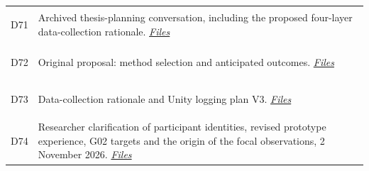 \begin{longtable}{@{}p{14mm}>{\raggedright\arraybackslash}p{140mm}@{}}
\hypertarget{src:D71}{}\label{src:D71}D71 & Archived thesis-planning conversation, including the proposed four-layer data-collection rationale. \href{https://github.com/YiyangQin-UQ/REIT7841/blob/main/thesis/v1.1/materials/README.md\#d71}{\textit{Files}} \\
\hypertarget{src:D72}{}\label{src:D72}D72 & Original proposal: method selection and anticipated outcomes. \href{https://github.com/YiyangQin-UQ/REIT7841/blob/main/thesis/v1.1/materials/README.md\#d72}{\textit{Files}} \\
\hypertarget{src:D73}{}\label{src:D73}D73 & Data-collection rationale and Unity logging plan V3. \href{https://github.com/YiyangQin-UQ/REIT7841/blob/main/thesis/v1.1/materials/README.md\#d73}{\textit{Files}} \\
\hypertarget{src:D74}{}\label{src:D74}D74 & Researcher clarification of participant identities, revised prototype experience, G02 targets and the origin of the focal observations, 2 November 2026. \href{https://github.com/YiyangQin-UQ/REIT7841/blob/main/thesis/v1.1/materials/README.md\#d74}{\textit{Files}} \\
\end{longtable}
\endgroup

